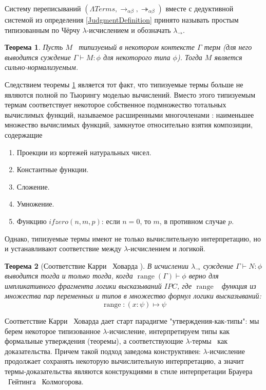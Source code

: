 \documentclass{article}[12pt]
\newtheorem{theorem}{Теорема}
\newcommand{\dash}{\textemdash\ }
\begin{document}
Систему переписываний $(\Lambda Terms, \rightarrow_{\alpha \beta}, \twoheadrightarrow_{\alpha \beta})$
вместе с дедуктивной системой из определения \ref{JudgmentDefinition} принято называть
простым типизованным по Чёрчу $\lambda$-исчислением и обозначать $\lambda_\rightarrow$.

\begin{theorem}
    \label{SimplyTypedStrongNormaliztionTheorem}
    Пусть $M$ \dash типизуемый в некотором контексте $\Gamma$ терм (для него выводится суждение $\Gamma \vdash M : \phi$ для некоторого типа $\phi$).
    Тогда $M$ является сильно-нормализуемым.
\end{theorem}

Следствием теоремы \ref{SimplyTypedStrongNormaliztionTheorem} является тот факт, что типизуемые термы
больше не являются полной по Тьюрингу моделью вычислений. Вместо этого типизуемым термам
соответствует некоторое собственное подмножество тотальных вычислимых функций, называемое расширенными
многочленами \cite{Zakr07}: наименьшее множество вычислимых функций,
замкнутое относительно взятия композиции, содержащие
\begin{enumerate}
    \item Проекции из кортежей натуральных чисел.
    \item Константные функции.
    \item Сложение.
    \item Умножение.
    \item Функцию $ifzero(n, m, p)$: если $n = 0$, то $m$, в противном случае $p$.
\end{enumerate}

Однако, типизуемые термы имеют не только вычислительную интерпретацию,
но и устанавливают соответствие между $\lambda$-исчислением и логикой.

\begin{theorem}[Соответствие Карри \dash Ховарда \cite{SorUrz06}]
    \label{CarryHowardTheorem}
    В исчислении $\lambda_\rightarrow$ суждение $\Gamma \vdash N : \phi$ выводится тогда и только
    тогда, когда $\operatorname{range}(\Gamma) \vdash \phi$ верно для импликативного фрагмента логики высказываний $IPC$,
    где $\operatorname{range}$ \dash функция из множества пар переменных и типов в множество формул логики высказываний:
    $$\operatorname{range} : (x : \psi) \mapsto \psi$$
\end{theorem}

Соответствие Карри \dash Ховарда дает старт парадигме "утверждения-как-типы": мы берем некоторое типизованное
$\lambda$-исчисление, интерпретируем типы как формальные утверждения (теоремы), а соответствующие
$\lambda$-термы \dash как доказательства. Причем такой подход заведома конструктивен: $\lambda$-исчисление
продолжает сохранять некоторую вычислительную интерпретацию, а значит термы-доказательства
являются конструкциями в стиле интерпретации Брауера \dash Гейтинга \dash Колмогорова.
\end{document}
